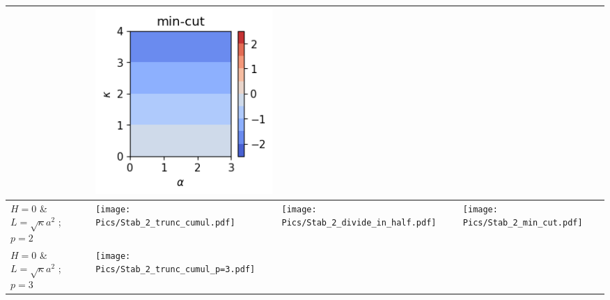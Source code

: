 \begin{landscape}
\begin{longtable}{|p{3cm}|p{7.2cm}|p{7.2cm}|p{7.2cm}|}
\begin{minipage}{7cm}
    \end{minipage}&
    \begin{minipage}{7cm}
        \centering
        \includegraphics[width=\textwidth]{Pics/Stab_1_min_cut_p=2.pdf}
    \end{minipage}\\
    \hline
    \hline
    $H=0$ \& $L = \sqrt{\kappa} a^2$ ; $p=2$ &
    \begin{minipage}{7cm}
        \centering
        \texttt{[image: Pics/Stab\_2\_trunc\_cumul.pdf]}
    \end{minipage}&
    \begin{minipage}{7cm}
        \centering
        \texttt{[image: Pics/Stab\_2\_divide\_in\_half.pdf]}
    \end{minipage}&
    \begin{minipage}{7cm}
        \centering
        \texttt{[image: Pics/Stab\_2\_min\_cut.pdf]}
    \end{minipage}\\
    \hline
    $H=0$ \& $L = \sqrt{\kappa} a^2$ ; $p=3$ &
    \begin{minipage}{7cm}
        \centering
        \texttt{[image: Pics/Stab\_2\_trunc\_cumul\_p=3.pdf]}
    \end{minipage}&
    \begin{minipage}{7cm}

\end{minipage}
\end{longtable}
\end{landscape}
